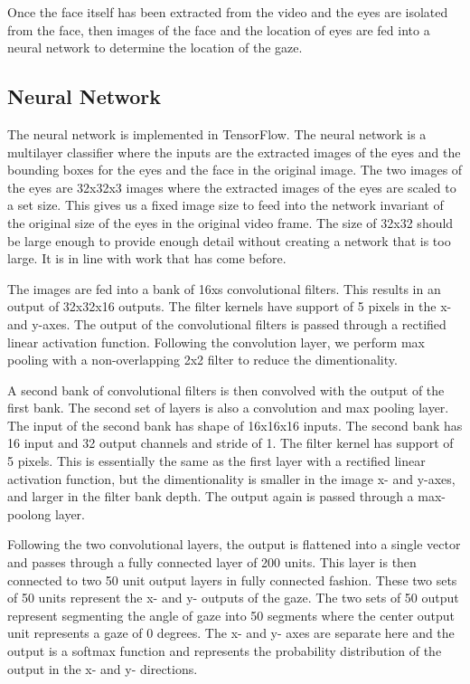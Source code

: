 \documentclass[10pt,twocolumn,letterpaper]{article}
\begin{document}
Once the face itself has been extracted from the video and the eyes
are isolated from the face, then images  of the face and the location
of eyes are fed into a neural network to determine the location of the
gaze.


\subsection{Neural Network}
The neural network is implemented in TensorFlow. The neural network is
a multilayer classifier where the inputs are the extracted images of
the eyes and the bounding boxes for the eyes and the face in the
original image. The two images of the eyes are 32x32x3 images where
the extracted images of the eyes are scaled to a set size. This gives
us a fixed image size to feed into the network invariant of the
original size of the eyes in the original video frame. The size of
32x32 should be large enough to provide enough detail without creating
a network that is too large. It is in line with work that has come
before.

The images are fed into a bank of 16xs convolutional
filters. This results in an output of 32x32x16 outputs. The filter
kernels have support of 5 pixels in the x- and y-axes. The output of
the convolutional filters is passed through a rectified linear
activation function. Following the convolution layer, we perform max pooling with a
non-overlapping 2x2 filter to reduce the dimentionality.

A second bank of convolutional filters is then convolved with the
output of the first bank. The second set of layers is also a
convolution and max pooling layer. The input of the second bank has
shape of 16x16x16 inputs. The second bank has 16 input and 32 output
channels and stride of 1. The filter kernel has support of 5
pixels. This is essentially the same as the first layer with a
rectified linear activation function, but the dimentionality is
smaller in the image x- and y-axes, and larger in the filter bank
depth. The output again is passed through a max-poolong layer.

Following the two convolutional layers, the output is flattened into a
single vector and passes through a fully connected layer of 200
units. This layer is then connected to two 50 unit output layers in
fully connected fashion. These two sets of 50 units represent the x-
and y- outputs of the gaze. The two sets of 50 output represent
segmenting the angle of gaze into 50 segments where the center output
unit represents a gaze of 0 degrees. The x- and y- axes are separate
here and the output is a softmax function and represents the
probability distribution of the output in the x- and y- directions.
\end{document}
